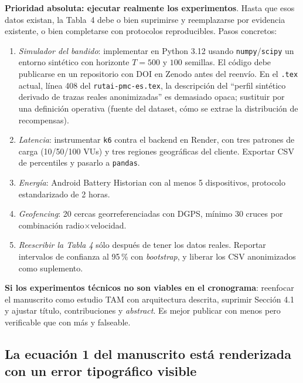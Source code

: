 \documentclass[11pt,a4paper]{article}
\begin{document}
\begin{abordaje}
\textbf{Prioridad absoluta: ejecutar realmente los experimentos}. Hasta que esos datos existan, la Tabla~4 debe o bien suprimirse y reemplazarse por evidencia existente, o bien completarse con protocolos reproducibles. Pasos concretos:

\begin{enumerate}
  \item \emph{Simulador del bandido}: implementar en Python 3.12 usando \texttt{numpy}/\texttt{scipy} un entorno sint\'etico con horizonte $T=500$ y $100$ semillas. El c\'odigo debe publicarse en un repositorio con DOI en Zenodo antes del reenv\'io. En el \texttt{.tex} actual, l\'inea 408 del \texttt{rutai-pmc-es.tex}, la descripci\'on del ``perfil sint\'etico derivado de trazas reales anonimizadas'' es demasiado opaca; sustituir por una definici\'on operativa (fuente del dataset, c\'omo se extrae la distribuci\'on de recompensas).
  \item \emph{Latencia}: instrumentar \texttt{k6} contra el backend en Render, con tres patrones de carga (10/50/100 VUs) y tres regiones geogr\'aficas del cliente. Exportar CSV de percentiles y pasarlo a \texttt{pandas}.
  \item \emph{Energ\'ia}: Android Battery Historian con al menos 5 dispositivos, protocolo estandarizado de 2 horas.
  \item \emph{Geofencing}: 20 cercas georreferenciadas con DGPS, m\'inimo 30 cruces por combinaci\'on radio$\times$velocidad.
  \item \emph{Reescribir la Tabla 4} s\'olo despu\'es de tener los datos reales. Reportar intervalos de confianza al 95\,\% con \emph{bootstrap}, y liberar los CSV anonimizados como suplemento.
\end{enumerate}

\textbf{Si los experimentos t\'ecnicos no son viables en el cronograma}: reenfocar el manuscrito como estudio TAM con arquitectura descrita, suprimir Secci\'on 4.1 y ajustar t\'itulo, contribuciones y \emph{abstract}. Es mejor publicar con menos pero verificable que con m\'as y falseable.
\end{abordaje}

\subsection{La ecuaci\'on 1 del manuscrito est\'a renderizada con un error tipogr\'afico visible}
\end{document}
